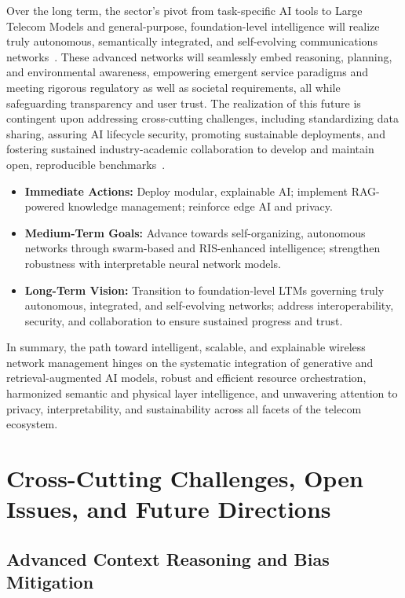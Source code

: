 Over the long term, the sector's pivot from task-specific AI tools to Large Telecom Models and general-purpose, foundation-level intelligence will realize truly autonomous, semantically integrated, and self-evolving communications networks~\cite{ref16, ref20, ref46, ref49}. These advanced networks will seamlessly embed reasoning, planning, and environmental awareness, empowering emergent service paradigms and meeting rigorous regulatory as well as societal requirements, all while safeguarding transparency and user trust. The realization of this future is contingent upon addressing cross-cutting challenges, including standardizing data sharing, assuring AI lifecycle security, promoting sustainable deployments, and fostering sustained industry-academic collaboration to develop and maintain open, reproducible benchmarks~\cite{ref16, ref46, ref49}.

\begin{itemize}
    \item \textbf{Immediate Actions:} Deploy modular, explainable AI; implement RAG-powered knowledge management; reinforce edge AI and privacy.
    \item \textbf{Medium-Term Goals:} Advance towards self-organizing, autonomous networks through swarm-based and RIS-enhanced intelligence; strengthen robustness with interpretable neural network models.
    \item \textbf{Long-Term Vision:} Transition to foundation-level LTMs governing truly autonomous, integrated, and self-evolving networks; address interoperability, security, and collaboration to ensure sustained progress and trust.
\end{itemize}

In summary, the path toward intelligent, scalable, and explainable wireless network management hinges on the systematic integration of generative and retrieval-augmented AI models, robust and efficient resource orchestration, harmonized semantic and physical layer intelligence, and unwavering attention to privacy, interpretability, and sustainability across all facets of the telecom ecosystem.

\section{Cross-Cutting Challenges, Open Issues, and Future Directions}

\subsection{Advanced Context Reasoning and Bias Mitigation}

